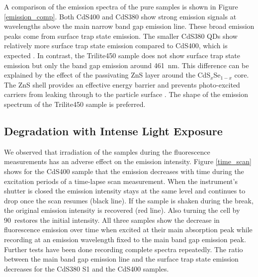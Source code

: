 \documentclass[cits]{JINST}
\begin{document}
A comparison of the emission spectra of the pure samples is shown in Figure \ref{emission_comp}. Both CdS400 and CdS380 show strong emission signals at wavelengths above the main narrow band gap emission line. These broad emission peaks come from surface trap state emission. The smaller CdS380 QDs show relatively more surface trap state emission compared to CdS400, which is expected \cite{capek}. In contrast, the Trilite450 sample does not show surface trap state emission but only the band gap emission around 461~nm. This difference can be explained by the effect of the passivating ZnS layer around the CdS$_x$Se$_{1-x}$ core. The ZnS shell provides an effective energy barrier and prevents photo-excited carriers from leaking through to the particle surface \cite{dabbousi1997}. The shape of the emission spectrum of the Trilite450 sample is preferred.

\subsection{Degradation with Intense Light Exposure}
We observed that irradiation of the samples during the fluorescence measurements has an adverse effect on the emission intensity. Figure \ref{time_scan} shows for the CdS400 sample that the emission decreases with time during the excitation periods of a time-lapse scan measurement. When the instrument's shutter is closed the emission intensity stays at the same level and continues to drop once the scan resumes (black line). If the sample is shaken during the break, the original emission intensity is recovered (red line). Also turning the cell by 90\textdegree ~restores the initial intensity. All three samples show the decrease in fluorescence emission over time when excited at their main absorption peak while recording at an emission wavelength fixed to the main band gap emission peak. Further tests have been done recording complete spectra repeatedly. The ratio between the main band gap emission line and the surface trap state emission decreases for the CdS380 S1 and the CdS400 samples. 
\end{document}
